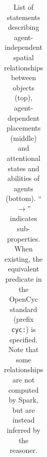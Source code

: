\documentclass[preprint,3p,times]{elsarticle}
\newcommand{\concept}[1]{{\small \texttt{#1}}}
\newcommand{\stmt}[1]{{\footnotesize \tt $\langle$ #1\relax$\rangle$}}
\newcommand{\eg}{{\textit{e.g.\ }}}
\begin{document}
\begin{table}[h]
\begin{tabular}{p{1.5cm}lp{2cm}p{3.7cm}}
	\end{tabular}

    \caption{List of statements describing agent-independent spatial
        relationships between objects (top), agent-dependent placements (middle)
        and attentional states and abilities of agents (bottom).
        ``$\rightarrow$'' indicates sub-properties. When existing, the
        equivalent predicate in the {\sc OpenCyc} standard (prefix \concept{cyc:})
        is specified. Note that some relationships are not computed by {\sc Spark}, but
        are instead inferred by the reasoner.}

	\label{facts}
\end{table}
\renewcommand{\concept}[1]{{\small \texttt{#1}}}

%
%
%
%
\end{document}
